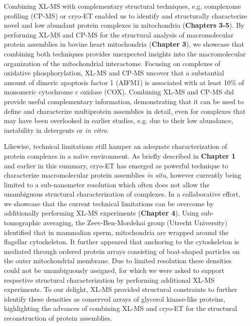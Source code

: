 Combining XL-MS with complementary structural techniques, e.g. complexome profiling (CP-MS) or cryo-ET enabled us to identify and structurally characterize novel and low abundant protein complexes in mitochondria (\textbf{Chapters 3-5}). By performing XL-MS and CP-MS for the structural analysis of macromolecular protein assemblies in bovine heart mitochondria (\textbf{Chapter 3}), we showcase that combining both techniques provides unexpected insights into the macromolecular organization of the mitochondrial interactome. Focusing on complexes of oxidative phosphorylation, XL-MS and CP-MS uncover that a substantial amount of dimeric apoptosis factor 1 (AIFM1) is associated with at least 10\% of monomeric cytochrome c oxidase (COX). Combining XL-MS and CP-MS did provide useful complementary information, demonstrating that it can be used to define and characterize multiprotein assemblies in detail, even for complexes that may have been overlooked in earlier studies, e.g. due to their low abundance, instability in detergents or \emph{in vitro}.

Likewise, technical limitations still hamper an adequate characterization of protein complexes in a naïve environment. As briefly described in \textbf{Chapter 1} and earlier in this summary, cryo-ET has emerged as powerful technique to characterize macromolecular protein assemblies \emph{in situ}, however currently being limited to a sub-nano\-meter resolution which often does not allow the unambiguous structural characterization of complexes. In a collaborative effort, we showcase that the current technical limitations can be overcome by additionally performing XL-MS experiments (\textbf{Chapter 4}). Using sub-tomographic averaging, the Zeev-Ben-Mordehai group (Utrecht University) identified that in mammalian sperm, mitochondria are wrapped around the flagellar cytoskeleton. It further appeared that anchoring to the cytoskeleton is mediated through ordered protein arrays consisting of boat-shaped particles on the outer mitochondrial membrane. Due to limited resolution these densities could not be unambiguously assigned, for which we were asked to support respective structural characterization by performing additional XL-MS experiments. To our delight, XL-MS provided structural constraints to further identify these densities as conserved arrays of glycerol kinase-like proteins, highlighting the advances of combining XL-MS and cryo-ET for the structural reconstruction of protein assemblies.

